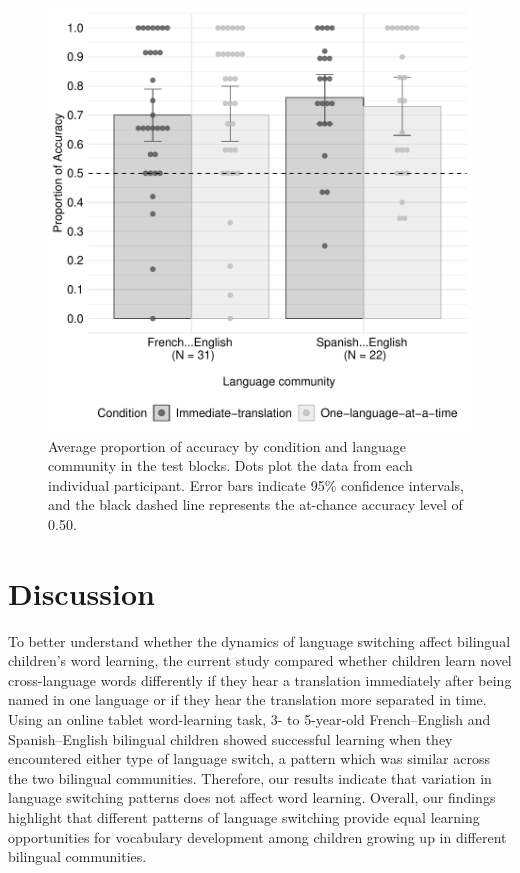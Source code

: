 \documentclass[
  man,floatsintext]{apa7}
\begin{document}
\begin{figure}

{\centering \includegraphics[width=0.6\linewidth]{TabletSwitch_paper_files/figure-latex/Figure3-1} 

}

\caption{Average proportion of accuracy by condition and language community in the test blocks. Dots plot the data from each individual participant. Error bars indicate 95\% confidence intervals, and the black dashed line represents the at-chance accuracy level of 0.50.}\label{fig:Figure3}
\end{figure}

\hypertarget{discussion}{%
\section{Discussion}\label{discussion}}

To better understand whether the dynamics of language switching affect bilingual children's word learning, the current study compared whether children learn novel cross-language words differently if they hear a translation immediately after being named in one language or if they hear the translation more separated in time. Using an online tablet word-learning task, 3- to 5-year-old French--English and Spanish--English bilingual children showed successful learning when they encountered either type of language switch, a pattern which was similar across the two bilingual communities. Therefore, our results indicate that variation in language switching patterns does not affect word learning. Overall, our findings highlight that different patterns of language switching provide equal learning opportunities for vocabulary development among children growing up in different bilingual communities.
\end{document}
